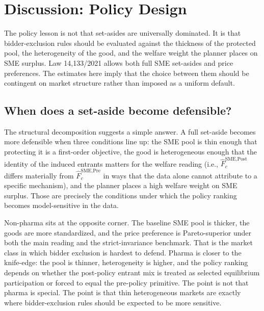 \section{Discussion: Policy Design}\label{sec:discussion}

The policy lesson is not that set-asides are universally dominated. It is that bidder-exclusion rules should be evaluated against the thickness of the protected pool, the heterogeneity of the good, and the welfare weight the planner places on SME surplus. Law 14{,}133/2021 allows both full SME set-asides and price preferences. The estimates here imply that the choice between them should be contingent on market structure rather than imposed as a uniform default.

\subsection{When does a set-aside become defensible?}

The structural decomposition suggests a simple answer. A full set-aside becomes more defensible when three conditions line up: the SME pool is thin enough that protecting it is a first-order objective, the good is heterogeneous enough that the identity of the induced entrants matters for the welfare reading (i.e., $\hat F_c^{\text{SME,Post}}$ differs materially from $\hat F_c^{\text{SME,Pre}}$ in ways that the data alone cannot attribute to a specific mechanism), and the planner places a high welfare weight on SME surplus. Those are precisely the conditions under which the policy ranking becomes model-sensitive in the data.

Non-pharma sits at the opposite corner. The baseline SME pool is thicker, the goods are more standardized, and the \optPrefThreshold{} price preference is Pareto-superior under both the main reading and the strict-invariance benchmark. That is the market class in which bidder exclusion is hardest to defend. Pharma is closer to the knife-edge: the pool is thinner, heterogeneity is higher, and the policy ranking depends on whether the post-policy entrant mix is treated as selected equilibrium participation or forced to equal the pre-policy primitive. The point is not that pharma is special. The point is that thin heterogeneous markets are exactly where bidder-exclusion rules should be expected to be more sensitive.

